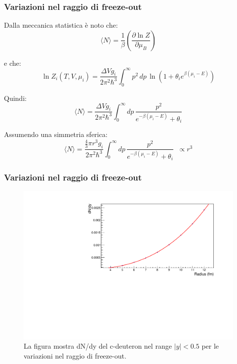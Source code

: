 \documentclass[11pt]{beamer}
\begin{document}
	\begin{frame}
		\frametitle{Variazioni nel raggio di freeze-out}
		Dalla meccanica statistica è noto che:
		\begin{equation}
			\langle N \rangle = \frac{1}{\beta} \left( \frac{\partial \ln Z}{\partial \mu_B}\right)
			\label{eq:stat_n}
		\end{equation}
		
		e che:
		\begin{equation}
			\boxed{\ln Z_i(T,V,\mu_i) =
				\frac{\Delta V g_i}{2\pi^2 \hbar^3}
				\int_{0}^{\infty} p^2 \, dp \,
				\ln \left( 1 + \theta_i e^{\beta(\mu_i - E)} \right)}
			\label{eq:partition_function}
		\end{equation}
		
		Quindi:
		\begin{equation}
			\boxed{\langle N \rangle =
				\frac{\Delta V g_i}{2\pi^2 \hbar^3}
				\int_{0}^{\infty} dp \,
				\frac{p^2}{e^{-\beta(\mu_i - E)} + \theta_i}}
			\label{eq:mean_particle_number}
		\end{equation}
		
		Assumendo una simmetria sferica:
		\begin{equation}
			\langle N \rangle =
			\frac{\tfrac{4}{3}\pi r^3 g_i}{2\pi^2 \hbar^3}
			\int_{0}^{\infty} dp \,
			\frac{p^2}{e^{-\beta(\mu_i - E)} + \theta_i}
			\;\;\propto r^3
		\end{equation}
	\end{frame}
	
	\begin{frame}
		\frametitle{Variazioni nel raggio di freeze-out}
		\begin{figure}
			
			\centering
			\includegraphics[width=1\linewidth]{pictures/var_radius.pdf	}
			\caption{La figura mostra dN/dy del c-deuteron nel range $|y| < 0.5$ per le variazioni nel raggio di freeze-out.}
			
		\end{figure}
	\end{frame}
	
\end{document}
